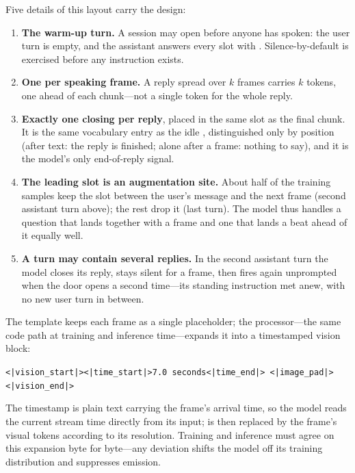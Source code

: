 Five details of this layout carry the design:
\begin{enumerate}[leftmargin=1.5em]
\item \textbf{The warm-up turn.} A session may open before anyone has
  spoken: the user turn is empty, and the assistant answers every slot
  with . Silence-by-default is exercised before any
  instruction exists.
\item \textbf{One  per speaking frame.} A reply
  spread over $k$ frames carries $k$  tokens, one
  ahead of each chunk---not a single token for the whole reply.
\item \textbf{Exactly one closing  per reply}, placed
  in the same slot as the final chunk. It is the same vocabulary entry
  as the idle , distinguished only by position (after
  text: the reply is finished; alone after a frame: nothing to say),
  and it is the model's only end-of-reply signal.
\item \textbf{The leading slot is an augmentation site.} About half of
  the training samples keep the slot between the user's message and the
  next frame (second assistant turn above); the rest drop it (last
  turn). The model thus handles a question that lands together with a
  frame and one that lands a beat ahead of it equally well.
\item \textbf{A turn may contain several replies.} In the second
  assistant turn the model closes its reply, stays silent for a frame,
  then fires again unprompted when the door opens a second time---its
  standing instruction met anew, with no new user turn in between.
\end{enumerate}

The template keeps each frame as a single  placeholder;
the processor---the same code path at training and inference
time---expands it into a timestamped vision block:
\begin{center}
\texttt{<|vision\_start|><|time\_start|>7.0 seconds<|time\_end|>%
<|image\_pad|><|vision\_end|>}
\end{center}
The timestamp is plain text carrying the frame's arrival time, so the
model reads the current stream time directly from its input;
 is then replaced by the frame's visual tokens
according to its resolution. Training and inference must agree on this
expansion byte for byte---any deviation shifts the model off its
training distribution and suppresses emission.

